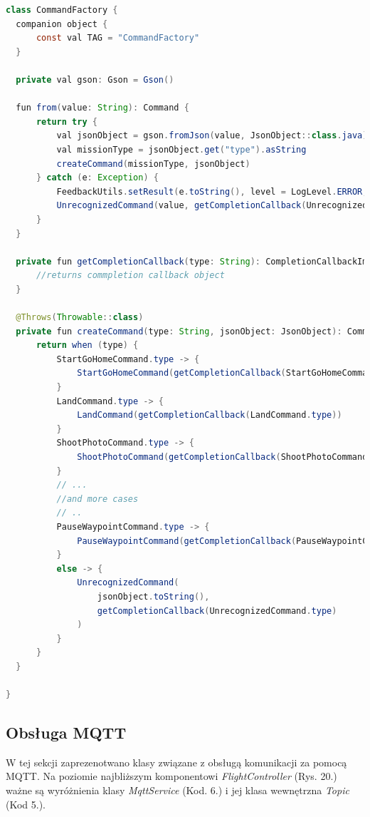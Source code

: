 \begin{lstlisting}[language=Java, caption=Klasa \textit{CommandFactory}]
class CommandFactory {
  companion object {
      const val TAG = "CommandFactory"
  }

  private val gson: Gson = Gson()

  fun from(value: String): Command {
      return try {
          val jsonObject = gson.fromJson(value, JsonObject::class.java)
          val missionType = jsonObject.get("type").asString
          createCommand(missionType, jsonObject)
      } catch (e: Exception) {
          FeedbackUtils.setResult(e.toString(), level = LogLevel.ERROR, tag = TAG)
          UnrecognizedCommand(value, getCompletionCallback(UnrecognizedCommand.type))
      }
  }

  private fun getCompletionCallback(type: String): CompletionCallbackImpl<DJIError> {
      //returns commpletion callback object
  }

  @Throws(Throwable::class)
  private fun createCommand(type: String, jsonObject: JsonObject): Command {
      return when (type) {
          StartGoHomeCommand.type -> {
              StartGoHomeCommand(getCompletionCallback(StartGoHomeCommand.type))
          }
          LandCommand.type -> {
              LandCommand(getCompletionCallback(LandCommand.type))
          }
          ShootPhotoCommand.type -> {
              ShootPhotoCommand(getCompletionCallback(ShootPhotoCommand.type))
          }
          // ...
          //and more cases
          // ..
          PauseWaypointCommand.type -> {
              PauseWaypointCommand(getCompletionCallback(PauseWaypointCommand.type))
          }
          else -> {
              UnrecognizedCommand(
                  jsonObject.toString(),
                  getCompletionCallback(UnrecognizedCommand.type)
              )
          }
      }
  }

}
\end{lstlisting}


\subsection{Obsługa MQTT}
 W tej sekcji zaprezenotwano klasy związane z obsługą komunikacji za pomocą MQTT. Na poziomie najbliższym komponentowi \textit{FlightController} (Rys. 20.) ważne są wyróżnienia klasy \textit{MqttService} (Kod. 6.) i jej klasa wewnętrzna \textit{Topic} (Kod 5.). 
 
